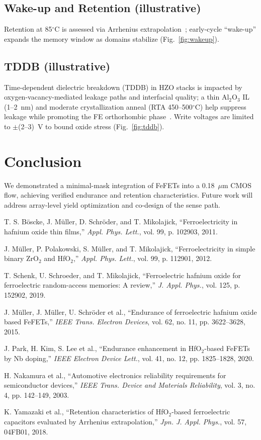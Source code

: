 \documentclass[conference]{IEEEtran}
\begin{document}
\subsection{Wake-up and Retention (illustrative)}
Retention at 85$^\circ$C is assessed via Arrhenius extrapolation~\cite{Yamazaki2018}; early-cycle “wake-up” expands the memory window as domains stabilize (Fig.~\ref{fig:wakeup}).

\subsection{TDDB (illustrative)}
Time-dependent dielectric breakdown (TDDB) in HZO stacks is impacted by oxygen-vacancy-mediated leakage paths and interfacial quality; a thin Al$_2$O$_3$ IL (1--2~nm) and moderate crystallization anneal (RTA 450--500$^\circ$C) help suppress leakage while promoting the FE orthorhombic phase~\cite{Mueller2015,Park2020}. Write voltages are limited to $\pm$(2--3)~V to bound oxide stress (Fig.~\ref{fig:tddb}).

\section{Conclusion}
We demonstrated a minimal-mask integration of FeFETs into a 0.18~$\mu$m CMOS flow, achieving verified endurance and retention characteristics. Future work will address array-level yield optimization and co-design of the sense path.

\begin{thebibliography}{8}
T. S. B\"oscke, J. M\"uller, D. Schr\"oder, and T. Mikolajick, ``Ferroelectricity in hafnium oxide thin films,'' \emph{Appl. Phys. Lett.}, vol. 99, p. 102903, 2011.

J. M\"uller, P. Polakowski, S. M\"uller, and T. Mikolajick, ``Ferroelectricity in simple binary ZrO$_2$ and HfO$_2$,'' \emph{Appl. Phys. Lett.}, vol. 99, p. 112901, 2012.

T. Schenk, U. Schroeder, and T. Mikolajick, ``Ferroelectric hafnium oxide for ferroelectric random-access memories: A review,'' \emph{J. Appl. Phys.}, vol. 125, p. 152902, 2019.

J. M\"uller, J. M\"uller, U. Schr\"oder et al., ``Endurance of ferroelectric hafnium oxide based FeFETs,'' \emph{IEEE Trans. Electron Devices}, vol. 62, no. 11, pp. 3622--3628, 2015.

J. Park, H. Kim, S. Lee et al., ``Endurance enhancement in HfO$_2$-based FeFETs by Nb doping,'' \emph{IEEE Electron Device Lett.}, vol. 41, no. 12, pp. 1825--1828, 2020.

H. Nakamura et al., ``Automotive electronics reliability requirements for semiconductor devices,'' \emph{IEEE Trans. Device and Materials Reliability}, vol. 3, no. 4, pp. 142--149, 2003.

K. Yamazaki et al., ``Retention characteristics of HfO$_2$-based ferroelectric capacitors evaluated by Arrhenius extrapolation,'' \emph{Jpn. J. Appl. Phys.}, vol. 57, 04FB01, 2018.
\end{thebibliography}
\end{document}
